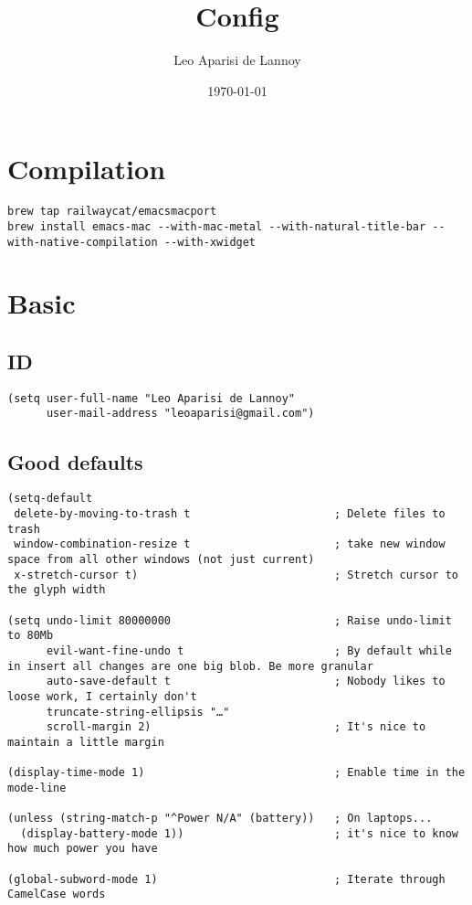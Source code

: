 \documentclass[c]{article}
\author{Leo Aparisi de Lannoy}
\date{\today}
\title{Config}
\theoremstyle{plain}%
\theoremstyle{definition}
\theoremstyle{remark}
\renewcommand{\tableofcontents}{\begingroup\hypersetup{hidelinks}\oldtoc\endgroup}
\begin{document}
\maketitle
\tableofcontents

\section{Compilation}
\label{sec:orgb636170}
\begin{verbatim}
brew tap railwaycat/emacsmacport
brew install emacs-mac --with-mac-metal --with-natural-title-bar --with-native-compilation --with-xwidget
\end{verbatim}
\section{Basic}
\label{sec:orga36ac5d}
\subsection{ID}
\label{sec:org6071d37}
\begin{verbatim}
(setq user-full-name "Leo Aparisi de Lannoy"
      user-mail-address "leoaparisi@gmail.com")
\end{verbatim}
\subsection{Good defaults}
\label{sec:org77e09af}
\begin{verbatim}
(setq-default
 delete-by-moving-to-trash t                      ; Delete files to trash
 window-combination-resize t                      ; take new window space from all other windows (not just current)
 x-stretch-cursor t)                              ; Stretch cursor to the glyph width

(setq undo-limit 80000000                         ; Raise undo-limit to 80Mb
      evil-want-fine-undo t                       ; By default while in insert all changes are one big blob. Be more granular
      auto-save-default t                         ; Nobody likes to loose work, I certainly don't
      truncate-string-ellipsis "…"
      scroll-margin 2)                            ; It's nice to maintain a little margin

(display-time-mode 1)                             ; Enable time in the mode-line

(unless (string-match-p "^Power N/A" (battery))   ; On laptops...
  (display-battery-mode 1))                       ; it's nice to know how much power you have

(global-subword-mode 1)                           ; Iterate through CamelCase words
\end{verbatim}
\end{document}
